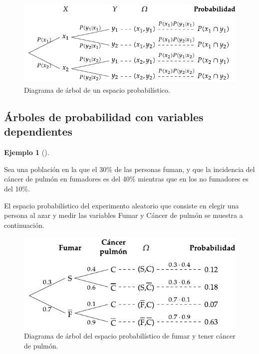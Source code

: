 \documentclass[
  a4paper,
]{scrreport}
\theoremstyle{plain}
\theoremstyle{definition}
\theoremstyle{definition}
\newtheorem{example}{Ejemplo}[chapter]
\theoremstyle{remark}
\begin{document}
\begin{figure}[H]

{\centering \includegraphics{img/probabilidad/espacio_probabilistico.pdf}

}

\caption{Diagrama de árbol de un espacio probabilístico.}

\end{figure}%

\subsection{Árboles de probabilidad con variables
dependientes}\label{uxe1rboles-de-probabilidad-con-variables-dependientes}

\begin{example}[]\protect\hypertarget{exm-arbol-probabilidad-variables-dependientes}{}\label{exm-arbol-probabilidad-variables-dependientes}

Sea una población en la que el 30\% de las personas fuman, y que la
incidencia del cáncer de pulmón en fumadores es del 40\% mientras que en
los no fumadores es del 10\%.

El espacio probabilístico del experimento aleatorio que consiste en
elegir una persona al azar y medir las variables Fumar y Cáncer de
pulmón se muestra a continuación.

\begin{figure}[H]

{\centering \includegraphics{img/probabilidad/espacio_probabilistico_fumar_cancer.pdf}

}

\caption{Diagrama de árbol del espacio probabilístico de fumar y tener
cáncer de pulmón.}

\end{figure}%

\end{example}
\end{document}

